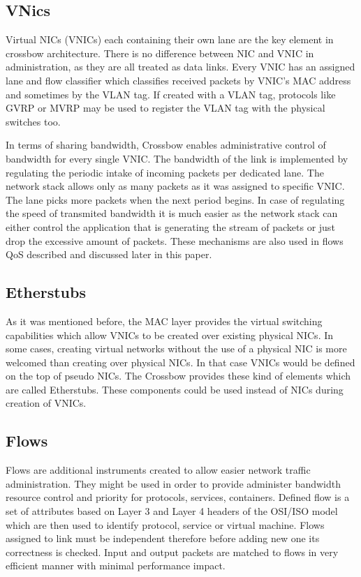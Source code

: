 \documentclass[11pt]{book}
\begin{document}
		\subsection{VNics}
			Virtual NICs (VNICs) each containing their own lane are the key element in crossbow architecture. There is no
			difference between NIC and VNIC in administration, as they are all treated as data links. Every VNIC has an assigned
			lane and flow classifier which classifies received packets by VNIC's MAC address and sometimes by the VLAN tag.
			If created with a VLAN tag, protocols like GVRP or MVRP may be used to register the VLAN tag with the physical switches
			too.	

			In terms of sharing bandwidth, Crossbow enables administrative control of bandwidth for every single VNIC. The bandwidth of the link
			is implemented by regulating the periodic intake of incoming packets per dedicated lane. The network stack allows only as many packets as it was 
			assigned to specific VNIC. The lane picks more packets when the next period begins. In case of regulating the speed of transmited bandwidth it is much
			easier as the network stack can either control the application that is generating the stream of packets or just drop the excessive amount of packets.
			These mechanisms are also used in flows QoS described and discussed later in this paper.

		\subsection{Etherstubs}

                        As it was mentioned before, the MAC layer provides the virtual switching capabilities which allow VNICs to be created over existing physical NICs.
                        In some cases, creating virtual networks without the use of a physical NIC is more welcomed than creating over physical NICs. In that case VNICs 
                        would be defined on the top of pseudo NICs. The Crossbow provides these kind of elements which are called Etherstubs. These components could be used
                        instead of NICs during creation of VNICs.

                \subsection{Flows}

                        Flows are additional instruments created to allow easier network traffic administration. They might be used in order to provide administer bandwidth resource control and priority for protocols, services, containers.
                        Defined flow is a set of attributes based on Layer 3 and Layer 4 headers of the OSI/ISO model which are then used to identify protocol, service or virtual machine. 
                        Flows assigned to link must be independent therefore before adding new one its correctness is checked. Input and output packets are matched to flows in very efficient 
                        manner with minimal performance impact.
\end{document}
